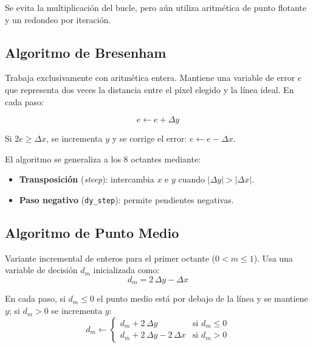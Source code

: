 \documentclass[12pt,a4paper]{article}
\begin{document}
Se evita la multiplicación del bucle, pero aún utiliza aritmética de punto flotante
y un redondeo por iteración.

\subsection{Algoritmo de Bresenham}

Trabaja exclusivamente con aritmética entera. Mantiene una variable de error $e$
que representa dos veces la distancia entre el píxel elegido y la línea ideal.
En cada paso:

\begin{equation}
  e \leftarrow e + \Delta y
\end{equation}

Si $2e \geq \Delta x$, se incrementa $y$ y se corrige el error:
$e \leftarrow e - \Delta x$.

El algoritmo se generaliza a los 8 octantes mediante:
\begin{itemize}
  \item \textbf{Transposición} (\textit{steep}): intercambia $x$ e $y$ cuando $|\Delta y| > |\Delta x|$.
  \item \textbf{Paso negativo} (\texttt{dy\_step}): permite pendientes negativas.
\end{itemize}

\subsection{Algoritmo de Punto Medio}

Variante incremental de enteros para el primer octante ($0 < m \leq 1$).
Usa una variable de decisión $d_m$ inicializada como:
\begin{equation}
  d_m = 2\,\Delta y - \Delta x
\end{equation}

En cada paso, si $d_m \leq 0$ el punto medio está por debajo de la línea y se
mantiene $y$; si $d_m > 0$ se incrementa $y$:
\begin{equation}
  d_m \leftarrow
  \begin{cases}
    d_m + 2\,\Delta y & \text{si } d_m \leq 0\\
    d_m + 2\,\Delta y - 2\,\Delta x & \text{si } d_m > 0
  \end{cases}
\end{equation}
\end{document}
